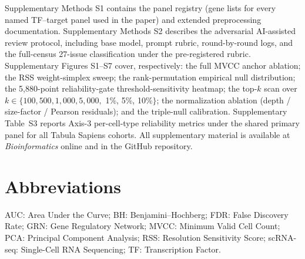 \documentclass[unnumsec,webpdf,contemporary,large,namedate]{oup-authoring-template}
\begin{document}
Supplementary Methods S1 contains the panel registry (gene lists for
every named TF--target panel used in the paper) and extended
preprocessing documentation. Supplementary Methods S2 describes the
adversarial AI-assisted review protocol, including base model, prompt
rubric, round-by-round logs, and the full-census 27-issue classification
under the pre-registered rubric. Supplementary Figures S1--S7 cover,
respectively: the full MVCC anchor ablation; the RSS weight-simplex
sweep; the rank-permutation empirical null distribution; the
5{,}880-point reliability-gate threshold-sensitivity heatmap; the
top-$k$ scan over $k \in \{100, 500, 1{,}000, 5{,}000,$ 1\%, 5\%,
10\%$\}$; the normalization ablation (depth / size-factor / Pearson
residuals); and the triple-null calibration. Supplementary Table~S3
reports Axis-3 per-cell-type reliability metrics under the shared
primary panel for all Tabula Sapiens cohorts. All supplementary
material is available at \textit{Bioinformatics} online and in the
GitHub repository.

\section*{Abbreviations}

\noindent
AUC: Area Under the Curve;
BH: Benjamini--Hochberg;
FDR: False Discovery Rate;
GRN: Gene Regulatory Network;
MVCC: Minimum Valid Cell Count;
PCA: Principal Component Analysis;
RSS: Resolution Sensitivity Score;
scRNA-seq: Single-Cell RNA Sequencing;
TF: Transcription Factor.
\end{document}
